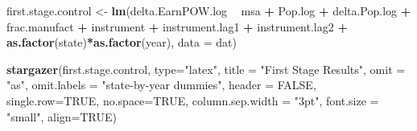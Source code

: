 \documentclass[
]{article}
\newenvironment{Shaded}{\begin{snugshade}}{\end{snugshade}}
\newcommand{\DataTypeTok}[1]{\textcolor[rgb]{0.13,0.29,0.53}{#1}}
\newcommand{\KeywordTok}[1]{\textcolor[rgb]{0.13,0.29,0.53}{\textbf{#1}}}
\newcommand{\NormalTok}[1]{#1}
\newcommand{\OperatorTok}[1]{\textcolor[rgb]{0.81,0.36,0.00}{\textbf{#1}}}
\newcommand{\OtherTok}[1]{\textcolor[rgb]{0.56,0.35,0.01}{#1}}
\newcommand{\StringTok}[1]{\textcolor[rgb]{0.31,0.60,0.02}{#1}}
\begin{document}
\begin{Shaded}
\begin{Highlighting}[]
\NormalTok{first.stage.control <-}\StringTok{ }\KeywordTok{lm}\NormalTok{(delta.EarnPOW.log }\OperatorTok{~}\StringTok{ }\NormalTok{msa }\OperatorTok{+}\StringTok{ }\NormalTok{Pop.log }\OperatorTok{+}\StringTok{ }
\StringTok{                            }\NormalTok{delta.Pop.log }\OperatorTok{+}\StringTok{ }\NormalTok{frac.manufact }\OperatorTok{+}\StringTok{ }\NormalTok{instrument }
                          \OperatorTok{+}\StringTok{ }\NormalTok{instrument.lag1 }\OperatorTok{+}\StringTok{ }\NormalTok{instrument.lag2 }\OperatorTok{+}\StringTok{ }
\StringTok{                            }\KeywordTok{as.factor}\NormalTok{(state)}\OperatorTok{*}\KeywordTok{as.factor}\NormalTok{(year), }\DataTypeTok{data =}\NormalTok{ dat)}
\end{Highlighting}
\end{Shaded}

\begin{Shaded}
\begin{Highlighting}[]
\KeywordTok{stargazer}\NormalTok{(first.stage.control, }\DataTypeTok{type=}\StringTok{"latex"}\NormalTok{, }\DataTypeTok{title =} \StringTok{"First Stage Results"}\NormalTok{, }
          \DataTypeTok{omit =} \StringTok{"as"}\NormalTok{, }\DataTypeTok{omit.labels =} \StringTok{"state-by-year dummies"}\NormalTok{, }\DataTypeTok{header =} \OtherTok{FALSE}\NormalTok{, }\DataTypeTok{single.row=}\OtherTok{TRUE}\NormalTok{,}
          \DataTypeTok{no.space=}\OtherTok{TRUE}\NormalTok{, }\DataTypeTok{column.sep.width =} \StringTok{"3pt"}\NormalTok{, }\DataTypeTok{font.size =} \StringTok{"small"}\NormalTok{, }\DataTypeTok{align=}\OtherTok{TRUE}\NormalTok{)}
\end{Highlighting}
\end{Shaded}
\end{document}
